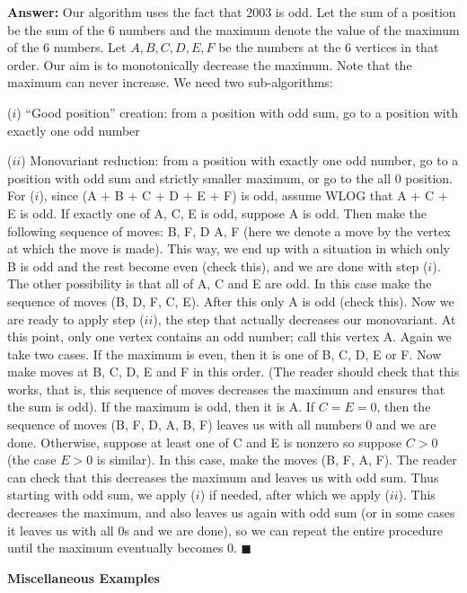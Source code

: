 \documentclass[a4paper,11pt]{book}
\begin{document}
\textbf{ Answer:}
Our algorithm uses the fact that 2003 is odd. Let the sum of a
position be the sum of the 6 numbers and the maximum denote
the value of the maximum of the 6 numbers. Let $A, B, C, D, E, F$ be
the numbers at the 6 vertices in that order. Our aim is to
monotonically decrease the maximum. Note that the maximum
can never increase.
We need two sub-algorithms:
\par\noindent($i$) “Good position” creation: from a position with odd sum, go to
a position with exactly one odd number
\par\noindent($ii$) Monovariant reduction: from a position with exactly one odd
number, go to a position with odd sum and strictly smaller
maximum, or go to the all 0 position.\\
For ($i$), since (A + B + C + D + E + F) is odd, assume WLOG that A
+ C + E is odd. If exactly one of A, C, E is odd, suppose A is odd.
Then make the following sequence of moves: B, F, D A, F (here we
denote a move by the vertex at which the move is made). This
way, we end up with a situation in which only B is odd and the
rest become even (check this), and we are done with step ($i$). The
other possibility is that all of A, C and E are odd. In this case make
the sequence of moves (B, D, F, C, E). After this only A is odd
(check this).
Now we are ready to apply step ($ii$), the step that actually
decreases our monovariant. At this point, only one vertex contains
an odd number; call this vertex A. Again we take two cases. If the
maximum is even, then it is one of B, C, D, E or F. Now make moves
at B, C, D, E and F in this order. (The reader should check that this
works, that is, this sequence of moves decreases the maximum
and ensures that the sum is odd). If the maximum is odd, then it is
A. If $C = E = 0$, then the sequence of moves (B, F, D, A, B, F) leaves
us with all numbers 0 and we are done. Otherwise, suppose at
least one of C and E is nonzero so suppose $C > 0$ (the case $E > 0$ is
similar). In this case, make the moves (B, F, A, F). The reader can
check that this decreases the maximum and leaves us with odd
sum.
Thus starting with odd sum, we apply ($i$) if needed, after which
we apply ($ii$). This decreases the maximum, and also leaves us
again with odd sum (or in some cases it leaves us with all 0s and
we are done), so we can repeat the entire procedure until the
maximum eventually becomes 0. \hfill $\blacksquare$\\

\begin{Large}
\begin{center}
\textbf{ Miscellaneous Examples}
\end{center}
\end{Large}
\end{document}
